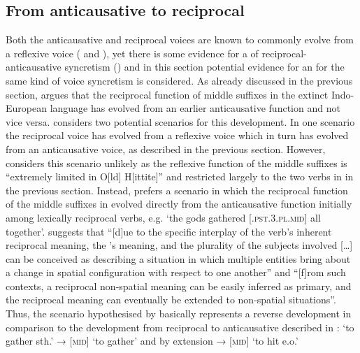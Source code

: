 \subsection{From anticausative to reciprocal} \label{diachrony:antc2recp}
Both the anticausative and reciprocal voices are known to commonly evolve from a reflexive voice ( and ), yet there is some evidence for a  of reciprocal-anticausative syncretism () and in this section potential evidence for an  for the same kind of voice syncretism is considered. As already discussed in the previous section, \cite{inglese:2017, inglese:2020} argues that the reciprocal function of middle suffixes in the extinct Indo-European language  has evolved from an earlier anticausative function and not vice versa. \citeauthor{inglese:2020} considers two potential scenarios for this development. In one scenario the reciprocal voice has evolved from a reflexive voice which in turn has evolved from an anticausative voice, as described in the previous section. However, \cite[238]{inglese:2020} considers this scenario unlikely as the reflexive function of the middle suffixes is “extremely limited in O[ld] H[ittite]” and restricted largely to the two verbs in  in the previous section. Instead, \cite[238]{inglese:2020} prefers a scenario in which the reciprocal function of the middle suffixes in  evolved directly from the anticausative function initially among lexically reciprocal verbs, e.g. ‘the gods gathered [.\textsc{pst.3.pl.mid}] all together’. \cite[239]{inglese:2020} suggests that “[d]ue to the specific interplay of the verb’s inherent reciprocal meaning, the ’s  meaning, and the plurality of the subjects involved […] can be conceived as describing a situation in which multiple entities bring about a change in spatial configuration with respect to one another” and “[f]rom such contexts, a reciprocal non-spatial meaning can be easily inferred as primary, and the reciprocal meaning can eventually be extended to non-spatial situations”. Thus, the scenario hypothesised by \citeauthor{inglese:2020} basically represents a reverse development in comparison to the development from reciprocal to anticausative described in :  ‘to gather sth.’ →  [\textsc{mid}] ‘to gather’ and by extension →  [\textsc{mid}] ‘to hit e.o.’

